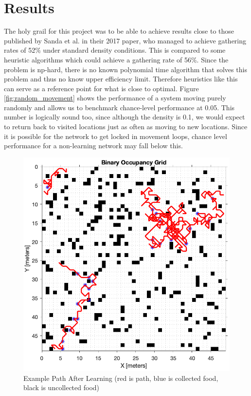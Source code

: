 \documentclass[11pt, twocolumn]{article}
\begin{document}
\section*{Results}
The holy grail for this project was to be able to achieve results close to those published by Sanda et al. \cite{sanda2017multi} in their 2017 paper, who managed to achieve gathering rates of 52\% under standard density conditions. This is compared to some heuristic algorithms which could achieve a gathering rate of 56\%. Since the problem is np-hard, there is no known polynomial time algorithm that solves this problem and thus no know upper efficiency limit. Therefore heuristics like this can serve as a reference point for what is close to optimal. Figure \ref{fig:random_movement} shows the performance of a system moving purely randomly and allows us to benchmark chance-level performance at 0.05. This number is logically sound too, since although the density is 0.1, we would expect to return back to visited locations just as often as moving to new locations. Since it is possible for the network to get locked in movement loops, chance level performance for a non-learning network may fall below this. 

\begin{figure}[H]
	\centering
	\includegraphics[width=\linewidth]{learned_path}
	\caption{Example Path After Learning (red is path, blue is collected food, black is uncollected food)}
	\label{fig:learned_path}
\end{figure}
\end{document}
